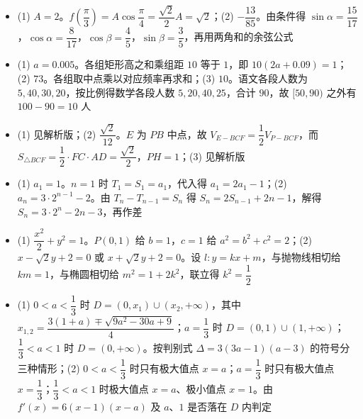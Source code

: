 \begin{itemize}[leftmargin=2.6em]
  \item[\textbf{16.}] (1) $A=2$。$f\left(\dfrac\pi3\right)=A\cos\dfrac\pi4=\dfrac{\sqrt2}{2}A=\sqrt2$；(2) $-\dfrac{13}{85}$。由条件得 $\sin\alpha=\dfrac{15}{17}$，$\cos\alpha=\dfrac{8}{17}$，$\cos\beta=\dfrac45$，$\sin\beta=\dfrac35$，再用两角和的余弦公式
  \item[\textbf{17.}] (1) $a=0.005$。各组矩形高之和乘组距 $10$ 等于 $1$，即 $10(2a+0.09)=1$；(2) $73$。各组取中点乘以对应频率再求和；(3) $10$。语文各段人数为 $5,40,30,20$，按比例得数学各段人数 $5,20,40,25$，合计 $90$，故 $[50,90)$ 之外有 $100-90=10$ 人
  \item[\textbf{18.}] (1) 见解析版；(2) $\dfrac{\sqrt2}{12}$。$E$ 为 $PB$ 中点，故 $V_{E-BCF}=\dfrac12V_{P-BCF}$，而 $S_{\triangle BCF}=\dfrac12\cdot FC\cdot AD=\dfrac{\sqrt2}{2}$，$PH=1$；(3) 见解析版
  \item[\textbf{19.}] (1) $a_1=1$。$n=1$ 时 $T_1=S_1=a_1$，代入得 $a_1=2a_1-1$；(2) $a_n=3\cdot2^{n-1}-2$。由 $T_n-T_{n-1}=S_n$ 得 $S_n=2S_{n-1}+2n-1$，解得 $S_n=3\cdot2^n-2n-3$，再作差
  \item[\textbf{20.}] (1) $\dfrac{x^2}{2}+y^2=1$。$P(0,1)$ 给 $b=1$，$c=1$ 给 $a^2=b^2+c^2=2$；(2) $x-\sqrt2y+2=0$ 或 $x+\sqrt2y+2=0$。设 $l:y=kx+m$，与抛物线相切给 $km=1$，与椭圆相切给 $m^2=1+2k^2$，联立得 $k^2=\dfrac12$
  \item[\textbf{21.}] (1) $0<a<\dfrac13$ 时 $D=(0,x_1)\cup(x_2,+\infty)$，其中 $x_{1,2}=\dfrac{3(1+a)\mp\sqrt{9a^2-30a+9}}4$；$a=\dfrac13$ 时 $D=(0,1)\cup(1,+\infty)$；$\dfrac13<a<1$ 时 $D=(0,+\infty)$。按判别式 $\Delta=3(3a-1)(a-3)$ 的符号分三种情形；(2) $0<a<\dfrac13$ 时只有极大值点 $x=a$；$a=\dfrac13$ 时只有极大值点 $x=\dfrac13$；$\dfrac13<a<1$ 时极大值点 $x=a$、极小值点 $x=1$。由 $f'(x)=6(x-1)(x-a)$ 及 $a$、$1$ 是否落在 $D$ 内判定
\end{itemize}
